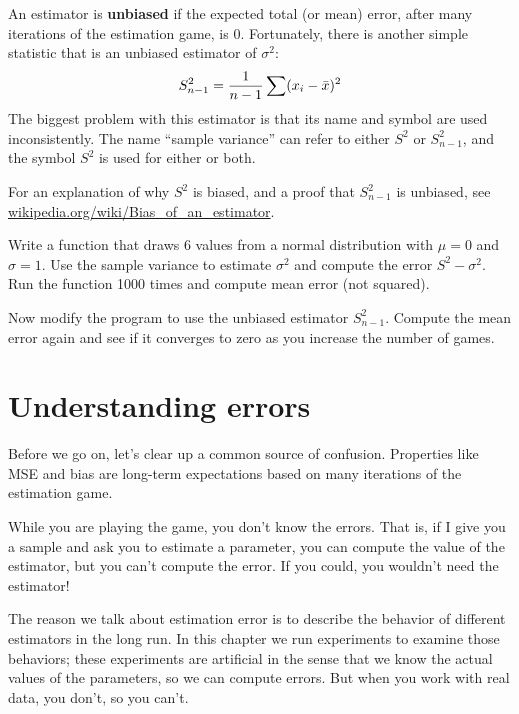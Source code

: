 \documentclass[12pt]{book}
\begin{document}


An estimator is {\bf unbiased} if the expected total (or mean) error,
after many iterations of the estimation game, is 0.
Fortunately, there is another simple statistic that is an unbiased
estimator of $\sigma^2$:
%
\[ S_{n-1}^2 = \frac{1}{n-1} \sum (x_i - \bar{x})^2 \] 
%
The biggest problem with this estimator is that its name and symbol
are used inconsistently.  The name ``sample variance'' can refer to
either $S^2$ or $S_{n-1}^2$, and the symbol $S^2$ is used
for either or both.

For an explanation of why $S^2$ is biased, and a proof that
$S_{n-1}^2$ is unbiased, see
\url{wikipedia.org/wiki/Bias_of_an_estimator}.

\begin{ex}


Write a function that draws 6 values from a normal distribution with
$\mu=0$ and $\sigma=1$.  Use the sample variance to estimate
$\sigma^2$ and compute the error $S^2 - \sigma^2$.  Run the function 1000
times and compute mean error (not squared).

Now modify the program to use the unbiased estimator $S_{n-1}^2$.
Compute the mean error again and see if it converges to zero as you
increase the number of games.

\end{ex}


\section{Understanding errors}


Before we go on, let's clear up a common source of confusion.
Properties like MSE and bias are long-term expectations based on
many iterations of the estimation game.

While you are playing the game, you don't know the errors.  That is,
if I give you a sample and ask you to estimate a parameter, you
can compute the value of the estimator, but you can't compute the
error.  If you could, you wouldn't need the estimator!

The reason we talk about estimation error is to describe the behavior
of different estimators in the long run.  In this chapter we run
experiments to examine those behaviors; these experiments are
artificial in the sense that we know the actual values of the
parameters, so we can compute errors.  But when you work with
real data, you don't, so you can't.
\end{document}
